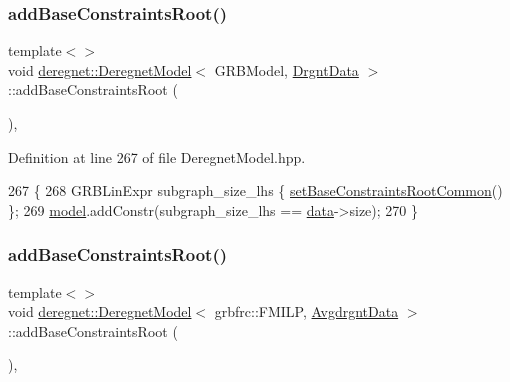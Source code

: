 \subsubsection{\texorpdfstring{add\+Base\+Constraints\+Root()}{addBaseConstraintsRoot()}\hspace{0.1cm}{\footnotesize\ttfamily [2/3]}}
{\footnotesize\ttfamily template$<$$>$ \\
void \hyperlink{classderegnet_1_1DeregnetModel}{deregnet\+::\+Deregnet\+Model}$<$ G\+R\+B\+Model, \hyperlink{classderegnet_1_1DrgntData}{Drgnt\+Data} $>$\+::add\+Base\+Constraints\+Root (\begin{DoxyParamCaption}{ }\end{DoxyParamCaption})\hspace{0.3cm}{\ttfamily [inline]}, {\ttfamily [private]}}



Definition at line 267 of file Deregnet\+Model.\+hpp.


\begin{DoxyCode}
267                                                                 \{
268     GRBLinExpr subgraph\_size\_lhs \{ \hyperlink{classderegnet_1_1DeregnetModel_ab6093e7558a653c17145e8e08a96938f}{setBaseConstraintsRootCommon}() \};
269     \hyperlink{classderegnet_1_1DeregnetModel_a30d525de2086e342b33fe3e45ede4947}{model}.addConstr(subgraph\_size\_lhs == \hyperlink{classderegnet_1_1DeregnetModel_ad5399761cf6293a702f3800bda4806d1}{data}->size);
270 \}
\end{DoxyCode}
\mbox{\label{classderegnet_1_1DeregnetModel_a075dee6e8c4cb899b485dc3627e78791}} 
\subsubsection{\texorpdfstring{add\+Base\+Constraints\+Root()}{addBaseConstraintsRoot()}\hspace{0.1cm}{\footnotesize\ttfamily [3/3]}}
{\footnotesize\ttfamily template$<$$>$ \\
void \hyperlink{classderegnet_1_1DeregnetModel}{deregnet\+::\+Deregnet\+Model}$<$ grbfrc\+::\+F\+M\+I\+LP, \hyperlink{classderegnet_1_1AvgdrgntData}{Avgdrgnt\+Data} $>$\+::add\+Base\+Constraints\+Root (\begin{DoxyParamCaption}{ }\end{DoxyParamCaption})\hspace{0.3cm}{\ttfamily [inline]}, {\ttfamily [private]}}



